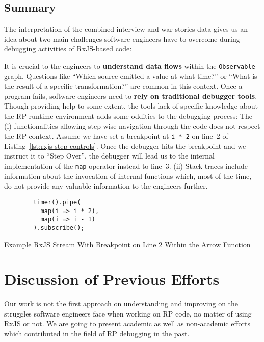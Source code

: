 \documentclass[12pt,a4paper]{article}
\begin{document}
\subsection{Summary}

The interpretation of the combined interview and war stories data gives us an idea about two main challenges software engineers have to overcome during debugging activities of RxJS-based code:

It is crucial to the engineers to \textbf{understand data flows}  within the \texttt{Observable} graph. Questions like ``Which source emitted a value at what time?'' or ``What is the result of a specific transformation?'' are common in this context. Once a program fails, software engineers need to \textbf{rely on traditional debugger tools}. Though providing help to some extent, the tools lack of specific knowledge about the RP runtime environment adds some oddities to the debugging process: The (i) functionalities allowing step-wise navigation through the code does not respect the RP context. Assume we have set a breakpoint at \texttt{i * 2} on line~2 of Listing~\ref{lst:rxjs-step-controls}. Once the debugger hits the breakpoint and we instruct it to ``Step Over'', the debugger will lead us to the internal implementation of the \texttt{map} operator instead to line~3. (ii) Stack traces include information about the invocation of internal functions which, most of the time, do not provide any valuable information to the engineers further.

\begin{listing}[H]
	\begin{verbatim}
		timer().pipe(
		  map(i => i * 2),
		  map(i => i - 1)
		).subscribe();
	\end{verbatim}
	\caption{Example RxJS Stream With Breakpoint on Line 2 Within the Arrow Function}
	\label{lst:rxjs-step-controls}
\end{listing}


\section{Discussion of Previous Efforts}
\label{sec:discussion}

Our work is not the first approach on understanding and improving on the struggles software engineers face when working on RP code, no matter of using RxJS or not. We are going to present academic as well as non-academic efforts which contributed in the field of RP debugging in the past.
\end{document}
